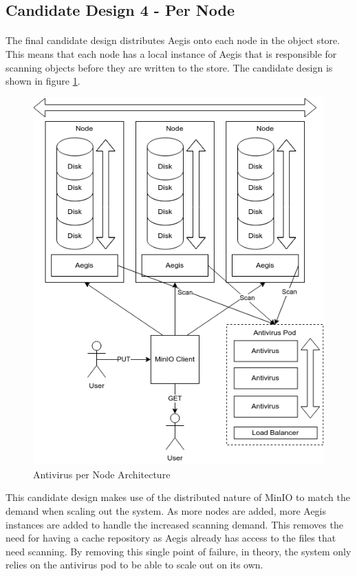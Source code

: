 \documentclass[12pt, conference, final, a4paper, onecolumn, compsoc]{IEEEtran}
\begin{document}
\subsection{Candidate Design 4 - Per Node}
\paragraph{}

The final candidate design distributes Aegis onto each node in the object store.
This means that each node has a local instance of Aegis that is responsible for
scanning objects before they are written to the store. The candidate design is
shown in figure \ref{fig:perNodeArch}.

\begin{figure}
  \centering \includegraphics[scale=.3]{diagrams/per-node.png}
  \caption{Antivirus per Node Architecture}
  \label{fig:perNodeArch}
\end{figure}

This candidate design makes use of the distributed nature of MinIO to match the
demand when scaling out the system. As more nodes are added, more Aegis
instances are added to handle the increased scanning demand. This removes the
need for having a cache repository as Aegis already has access to the files that
need scanning. By removing this single point of failure, in theory, the system
only relies on the antivirus pod to be able to scale out on its own.
\end{document}
